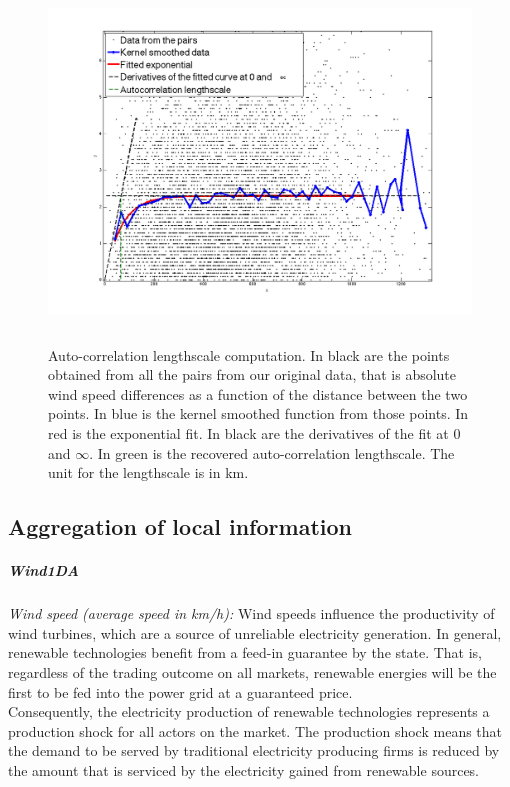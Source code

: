 \begin{figure}[!ht]
\begin{center} \includegraphics[height=95mm]{forqgis/lautocorgraph.png}
\end{center}\vspace{-0.9cm}
\caption{Auto-correlation lengthscale computation. In black are the points obtained from all the pairs from our original data, that is absolute wind speed differences as a function of the distance between the two points. In blue is the kernel smoothed function from those points. In red is the exponential fit. In black are the derivatives of the fit at $0$ and $\infty$. In green is the recovered auto-correlation lengthscale. The unit for the lengthscale is in km.}
\label{figautocorrel}
\end{figure}

\subsection{Aggregation of local information}
\subparagraph{Wind1DA}
\label{Wind1DA}

\textit{Wind speed (average speed in km/h):} 
\label{winddetail}
Wind speeds influence the productivity of wind turbines, which are a source of unreliable electricity generation. In general, renewable technologies benefit from a feed-in guarantee by the state. That is, regardless of the trading outcome on all markets, renewable energies will be the first to be fed into the power grid at a guaranteed price. \\

Consequently, the electricity production of renewable technologies represents a production shock for all actors on the market. The production shock means that the demand to be served by traditional electricity producing firms is reduced by the amount that is serviced by the electricity gained from renewable sources. \\

